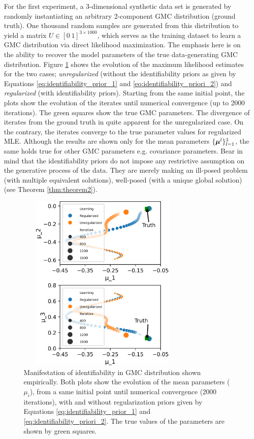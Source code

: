 \documentclass{article}
\theoremstyle{plain}
\theoremstyle{definition}
\theoremstyle{remark}
\begin{document}
For the first experiment, a 3-dimensional synthetic data set is generated by randomly instantiating an arbitrary 2-component GMC distribution (ground truth). One thousand random samples are generated from this distribution to yield a matrix $U \in [0 \ 1]^{3\times 1000}$, which serves as the training dataset to learn a GMC distribution via direct likelihood maximization. The emphasis here is on the ability to recover the model parameters of the true data-generating GMC distribution. Figure \ref{fig:identifiability_exp} shows the evolution of the maximum likelihood estimates for the two cases; \emph{unregularized} (without the identifiability priors as given by Equations \eqref{eq:identifiability_prior_1} and \eqref{eq:identifiability_priori_2}) and \emph{regularized} (with identifiability priors). Starting from the same initial point, the plots show the evolution of the iterates until numerical convergence (up to 2000 iterations). The green squares show the true GMC parameters. The divergence of iterates from the ground truth in quite apparent for the unregularized case. On the contrary, the iterates converge to the true parameter values for regularized MLE. Although the results are shown only for the mean parameters $\{\boldsymbol{\mu}^l \}_{l=1}^3$, the same holds true for other GMC parameters e.g. covariance parameters. Bear in mind that the identifiability priors do not impose any restrictive assumption on the generative process of the data. They are merely making an ill-posed problem (with multiple equivalent solutions), well-posed (with a unique global solution) (see Theorem \eqref{thm:theorem2}).
\begin{figure}[ht]
\includegraphics[width= 240pt,height=250pt]{figures/Identifiability_Experiment.png}
\caption{Manifestation of identifiability in GMC distribution shown empirically. Both plots show the evolution of the mean parameters ($\mu_i$), from a same initial point until numerical convergence (2000 iterations), with and without regularization priors given by Equations \eqref{eq:identifiability_prior_1} and \eqref{eq:identifiability_priori_2}. The true values of the  parameters are shown by green squares.}
\label{fig:identifiability_exp}
\end{figure} 
\end{document}
